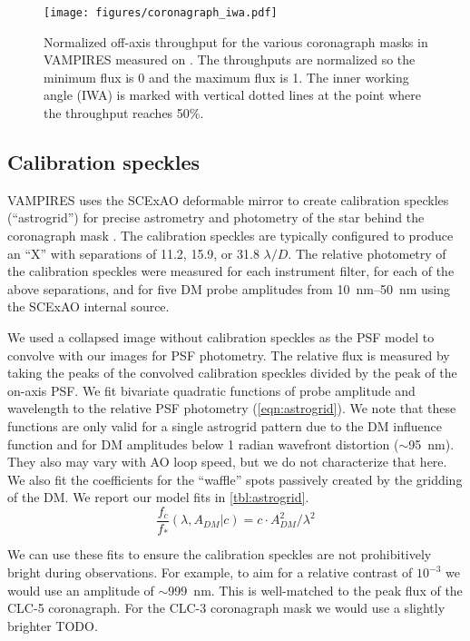\begin{figure}
    \centering
    \texttt{[image: figures/coronagraph\_iwa.pdf]}
    \caption{Normalized off-axis throughput for the various coronagraph masks in VAMPIRES measured on . The throughputs are normalized so the minimum flux is 0 and the maximum flux is 1. The inner working angle (IWA) is marked with vertical dotted lines at the point where the throughput reaches 50\%.\label{fig:iwa}}
\end{figure}

\subsection{Calibration speckles}

VAMPIRES uses the SCExAO deformable mirror to create calibration speckles (``astrogrid'') for precise astrometry and photometry of the star behind the coronagraph mask \citep{sahoo_precision_2020}. The calibration speckles are typically configured to produce an ``X'' with separations of 11.2, 15.9, or 31.8 $\lambda/D$. The relative photometry of the calibration speckles were measured for each instrument filter, for each of the above separations, and for five DM probe amplitudes from \SIrange{10}{50}{\nano\meter} using the SCExAO internal source. 

We used a collapsed image without calibration speckles as the PSF model to convolve with our images for PSF photometry. The relative flux is measured by taking the peaks of the convolved calibration speckles divided by the peak of the on-axis PSF. We fit bivariate quadratic functions of probe amplitude and wavelength to the relative PSF photometry (\autoref{eqn:astrogrid}). We note that these functions are only valid for a single astrogrid pattern due to the DM influence function and for DM amplitudes below 1 radian wavefront distortion ($\sim$\SI{95}{\nano\meter}). They also may vary with AO loop speed, but we do not characterize that here. We also fit the coefficients for the ``waffle'' spots passively created by the gridding of the DM. We report our model fits in \autoref{tbl:astrogrid}.
\begin{equation}
    \label{eqn:astrogrid}
    \frac{f_{c}}{f_*}\left( \lambda, A_{DM} | c \right) = c \cdot A_{DM}^2 / \lambda^2
\end{equation}

We can use these fits to ensure the calibration speckles are not prohibitively bright during observations. For example, to aim for a relative contrast of $10^{-3}$ we would use an amplitude of $\sim$\SI{999}{\nano\meter}. This is well-matched to the peak flux of the CLC-5 coronagraph. For the CLC-3 coronagraph mask we would use a slightly brighter TODO.


